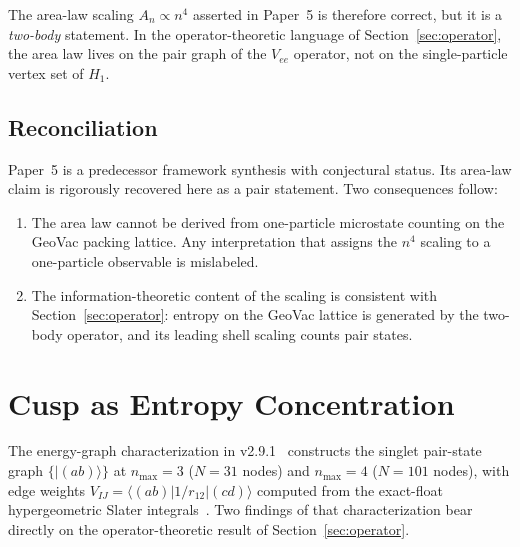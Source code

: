 \documentclass[twocolumn,pra,amsmath,amssymb,superscriptaddress]{revtex4-2}
\begin{document}
The area-law scaling $A_n \propto n^{4}$ asserted in Paper~5
is therefore correct, but it is a \emph{two-body} statement.  In
the operator-theoretic language of Section~\ref{sec:operator},
the area law lives on the pair graph of the $V_{ee}$ operator,
not on the single-particle vertex set of $H_1$.

\subsection{Reconciliation}

Paper~5 is a predecessor framework synthesis with conjectural
status.  Its area-law claim is rigorously recovered here as a
pair statement.  Two consequences follow:
\begin{enumerate}
  \item The area law cannot be derived from one-particle
    microstate counting on the GeoVac packing lattice.  Any
    interpretation that assigns the $n^{4}$ scaling to a
    one-particle observable is mislabeled.
  \item The information-theoretic content of the scaling is
    consistent with Section~\ref{sec:operator}: entropy on the
    GeoVac lattice is generated by the two-body operator, and
    its leading shell scaling counts pair states.
\end{enumerate}

\section{Cusp as Entropy Concentration}
\label{sec:cusp}

The energy-graph characterization in v2.9.1~\cite{EnergyGraph}
constructs the singlet pair-state graph
$\{\lvert(ab)\rangle\}$ at $n_{\max}=3$ ($N=31$ nodes) and
$n_{\max}=4$ ($N=101$ nodes), with edge weights
$V_{IJ} = \langle (ab)\lvert 1/r_{12}\rvert (cd)\rangle$
computed from the exact-float hypergeometric Slater
integrals~\cite{GeoVac_Paper7}.  Two findings of that
characterization bear directly on the operator-theoretic
result of Section~\ref{sec:operator}.
\end{document}
